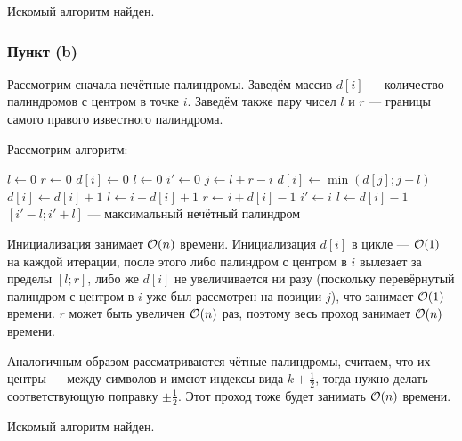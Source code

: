 Искомый алгоритм найден.

\subsubsection{Пункт (b)}
Рассмотрим сначала нечётные палиндромы.
Заведём массив $d[i]$ --- количество палиндромов с центром в точке $i$.
Заведём также пару чисел $l$ и $r$ --- границы самого правого известного палиндрома.

Рассмотрим алгоритм:

\noindent
\begin{minipage}{\hsize}
\begin{algorithmic}
    \State $l \gets 0$
    \State $r \gets 0$
        \State $d[i] \gets 0$
    \EndFor
    \State $l \gets 0$
    \State $i' \gets 0$
            \State $j \gets l + r - i$
            \State $d[i] \gets \min(d[j]; j - l)$
        \EndIf
            \State $d[i] \gets d[i] + 1$
        \EndWhile
            \State $l \gets i - d[i] + 1$
            \State $r \gets i + d[i] - 1$
        \EndIf
            \State $i' \gets i$
            \State $l \gets d[i] - 1$
        \EndIf
    \EndFor
    \State $[i' - l; i' + l]$ --- максимальный нечётный палиндром
\end{algorithmic}
\end{minipage}

Инициализация занимает $\mathcal{O}(n)$ времени.
Инициализация $d[i]$ в цикле --- $\mathcal{O}(1)$ на каждой итерации,
после этого либо палиндром с центром в $i$ вылезает за пределы $[l; r]$,
либо же $d[i]$ не увеличивается ни разу
(поскольку перевёрнутый палиндром с центром в $i$ уже был рассмотрен на позиции $j$),
что занимает $\mathcal{O}(1)$ времени.
$r$ может быть увеличен $\mathcal{O}(n)$ раз, поэтому весь проход занимает $\mathcal{O}(n)$ времени.

Аналогичным образом рассматриваются чётные палиндромы,
считаем, что их центры --- между символов и имеют индексы вида $k + \frac{1}{2}$,
тогда нужно делать соответствующую поправку $\pm \frac{1}{2}$.
Этот проход тоже будет занимать $\mathcal{O}(n)$ времени.

Искомый алгоритм найден.
